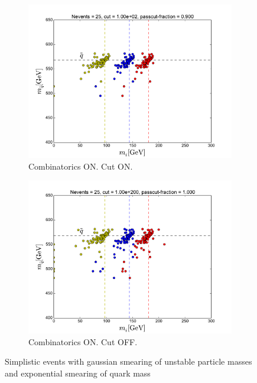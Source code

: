 \documentclass[twoside,english]{uiofysmaster}
\begin{document}
\begin{figure}[hbt]
	\begin{subfigure}[b]{0.49\textwidth}
		\includegraphics[width=\textwidth]{figures/making-sense/20150214_simplistic_events_with_gauss_and_exp_smearing_cut-100_combinatorics-ON.pdf} 
		\caption{Combinatorics ON. Cut ON.}
	\end{subfigure}
	\begin{subfigure}[b]{0.49\textwidth}
		\includegraphics[width=\textwidth]{figures/making-sense/20150214_simplistic_events_with_gauss_and_exp_smearing_nocut_combinatorics-ON.pdf} 
		\caption{Combinatorics ON. Cut OFF.}
	\end{subfigure}
	\caption{Simplistic events with gaussian smearing of unstable particle masses and exponential smearing of quark mass}
\end{figure}
\end{document}
